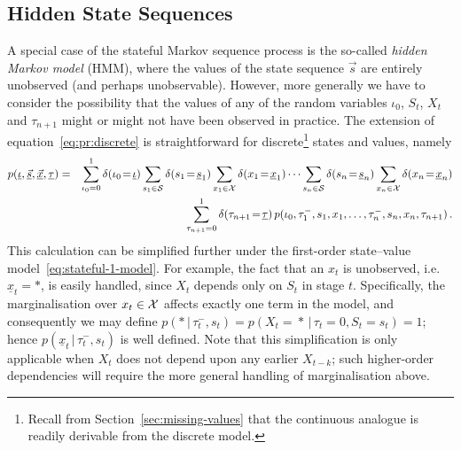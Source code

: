 \documentclass[a4paper]{article}
\newcommand{\ui}{\underline{\iota}}
\newcommand{\ut}{\underline{\tau}}
\newcommand{\tm}{\tau^{-}}
\newcommand{\vs}{\vec{s}}
\newcommand{\uvs}{\underline{\vs}}
\newcommand{\vx}{\vec{x}}
\newcommand{\uvx}{\underline{\vx}}
\newcommand{\ux}{\underline{x}}
\newcommand{\us}{\underline{s}}
\begin{document}
\subsection{Hidden State Sequences}\label{sec:hidden-state}

A special case of the stateful Markov sequence process is the so-called {\em hidden Markov model} (HMM), where the values of the state sequence $\vs$ are
entirely unobserved (and perhaps unobservable). However, more generally we have to consider the possibility that the values of any of the random variables 
$\iota_0$, $S_t$, $X_t$ and $\tau_{n+1}$ might or might not have been observed in practice. The extension of equation~\eqref{eq:pr:discrete} is straightforward
for discrete\footnote{Recall from Section~\ref{sec:missing-values} that the continuous analogue is readily derivable from the discrete model.} states and values, namely
\begin{eqnarray}
p(\ui,\uvs,\uvx,\ut) 
& = & 
\sum_{\iota_0=0}^{1}\delta(\iota_0\!=\!\ui)
\sum_{s_1\in{\cal S}} \delta(s_1\!=\!\us_1)
\sum_{x_1\in{\cal X}} \delta(x_1\!=\!\ux_1)
\cdots\sum_{s_n\in{\cal S}} \delta(s_n\!=\!\us_n)
\sum_{x_n\in{\cal X}} \delta(x_n\!=\!\ux_n)
\nonumber\\&&
\,\sum_{\tau_{n+1}=0}^{1}\delta(\tau_{n+1}\!=\!\ut)
\,p(\iota_0,\tm_1,s_1,x_1,\ldots,\tm_n,s_n,x_n,\tau_{n+1})\,.
\label{eq:pr:discrete:state-value}
\end{eqnarray}
This calculation can be simplified further under the first-order state--value model~\eqref{eq:stateful-1-model}.
For example, the fact that an $x_t$ is unobserved, i.e.\ $\ux_t=*$, is easily handled, since $X_t$ depends only on $S_t$ in stage $t$. Specifically, the marginalisation over $x_t\in{\cal X}$ affects exactly one term in the model, and consequently we may
define $p(*\,|\,\tm_t,s_t)=p(X_t\!=\!*\,|\,\tau_t\!=\!0,S_t\!=\!s_t)=1$; hence $p(\underline{x}_t\,|\,\tm_t,s_t)$ is well defined. Note that this simplification is only applicable when
$X_t$ does not depend upon any earlier $X_{t-k}$; such higher-order dependencies will require the more general handling of marginalisation above.
\end{document}
